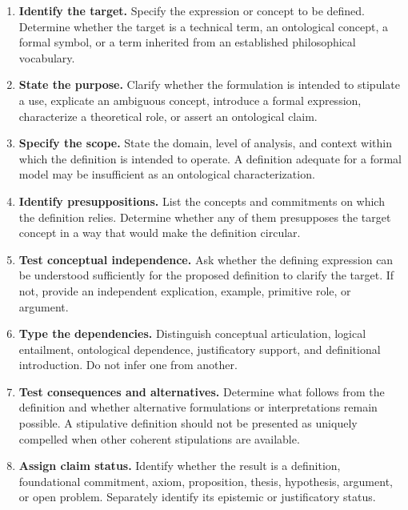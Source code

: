 \begin{enumerate}
  \item \textbf{Identify the target.}
  Specify the expression or concept to be defined. Determine
  whether the target is a technical term, an ontological concept,
  a formal symbol, or a term inherited from an established
  philosophical vocabulary.

  \item \textbf{State the purpose.}
  Clarify whether the formulation is intended to stipulate a use,
  explicate an ambiguous concept, introduce a formal expression,
  characterize a theoretical role, or assert an ontological claim.

  \item \textbf{Specify the scope.}
  State the domain, level of analysis, and context within which
  the definition is intended to operate. A definition adequate
  for a formal model may be insufficient as an ontological
  characterization.

  \item \textbf{Identify presuppositions.}
  List the concepts and commitments on which the definition
  relies. Determine whether any of them presupposes the target
  concept in a way that would make the definition circular.

  \item \textbf{Test conceptual independence.}
  Ask whether the defining expression can be understood
  sufficiently for the proposed definition to clarify the target.
  If not, provide an independent explication, example, primitive
  role, or argument.

  \item \textbf{Type the dependencies.}
  Distinguish conceptual articulation, logical entailment,
  ontological dependence, justificatory support, and definitional
  introduction. Do not infer one from another.

  \item \textbf{Test consequences and alternatives.}
  Determine what follows from the definition and whether
  alternative formulations or interpretations remain possible.
  A stipulative definition should not be presented as uniquely
  compelled when other coherent stipulations are available.

  \item \textbf{Assign claim status.}
  Identify whether the result is a definition, foundational
  commitment, axiom, proposition, thesis, hypothesis, argument,
  or open problem. Separately identify its epistemic or
  justificatory status.
\end{enumerate}

